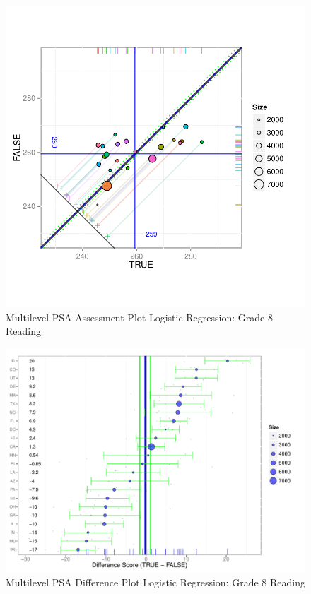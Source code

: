 \documentclass[letterpaper,12p,twoside]{article} %
\begin{document}
\begin{figure}[h!]
\begin{center}
\includegraphics[width=\textwidth]{../Figures2009/g8read-mlpsa-lr-circ.pdf}
\caption{Multilevel PSA Assessment Plot Logistic Regression: Grade 8 Reading}
\end{center}
\end{figure}

\begin{figure}[h!]
\begin{center}
\includegraphics[width=\textwidth]{../Figures2009/g8read-mlpsa-lr-diff.pdf}
\caption{Multilevel PSA Difference Plot Logistic Regression: Grade 8 Reading}
\end{center}
\end{figure}
\end{document}
